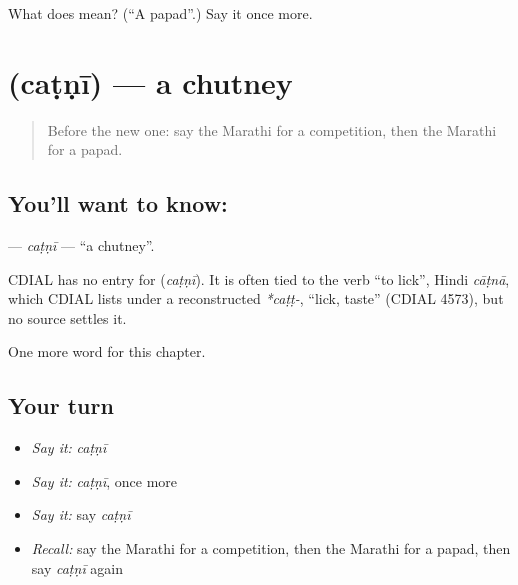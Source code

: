 \begin{tcolorbox}[breakable,colback=teal!4,colframe=teal!35!black,title={Before you move on}]
What does  mean? (\textquotedblleft{}A papad\textquotedblright{}.) Say it once more.
\end{tcolorbox}
\section[\texorpdfstring{\mr{चटणी} (caṭṇī)}{चटणी (caṭṇī)}]{ (caṭṇī) — a chutney}

\label{lesson:MR-C186-catni}



\begin{quote}
Before the new one: say the Marathi for a competition, then the Marathi for a papad.
\end{quote}

\subsection*{You'll want to know: }
\textbf{} — \emph{caṭṇī} — \textquotedblleft{}a chutney\textquotedblright{}.

\begin{cousinweb}
CDIAL has no entry for \textbf{} (\emph{caṭṇī}). It is often tied to the verb \textquotedblleft{}to lick\textquotedblright{}, Hindi \emph{cāṭnā}, which CDIAL lists under a reconstructed \emph{*caṭṭ-}, \textquotedblleft{}lick, taste\textquotedblright{} (CDIAL 4573), but no source settles it.
\end{cousinweb}

\begin{grammarlens}[title={What you've built}]
One more word for this chapter.
\end{grammarlens}

\subsection*{Your turn}
\begin{itemize}
\raggedright
  \item \emph{Say it:} \emph{caṭṇī}
  \item \emph{Say it:} \emph{caṭṇī}, once more
  \item \emph{Say it:} say \emph{caṭṇī}
  \item \emph{Recall:} say the Marathi for a competition, then the Marathi for a papad, then say \emph{caṭṇī} again
\end{itemize}

